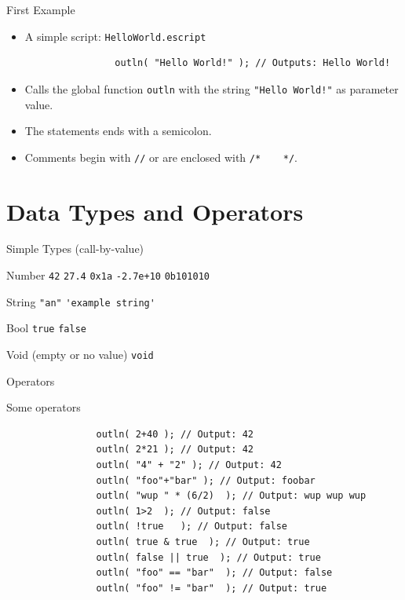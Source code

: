 \documentclass[ucs,9pt]{beamer}
\begin{document}
\begin{frame}[fragile]{First Example}
\begin{itemize}
	\addtolength{\itemsep}{\baselineskip}
	\item A simple script: \lstinline{HelloWorld.escript}
	\small
			\begin{lstlisting}
				outln( "Hello World!" ); // Outputs: Hello World!
			\end{lstlisting}
	\normalsize
	\pause
		\item Calls the global function \lstinline!outln! with the string  \lstinline{"Hello World!"}  as parameter value.
		\item The statements ends with a semicolon.
		\item Comments begin with  \lstinline{//}  or are enclosed with \lstinline{/*    */}.
\end{itemize}
\end{frame}


\section{Data Types and Operators}
\begin{frame}[fragile]{Simple Types (call-by-value)}
	\begin{block}{Number}
		\hfill \lstinline!42! \hfill \lstinline!27.4! \hfill \lstinline!0x1a! \hfill \lstinline!-2.7e+10! \hfill \lstinline!0b101010! \hfill{}
	\end{block}
	\begin{block}{String}
		\hfill \lstinline!"an"! \hfill \lstinline!'example string'!  \hfill{}
	\end{block}
	\begin{block}{Bool}
		\hfill \lstinline!true! \hfill \lstinline!false! \hfill{}
	\end{block}
	\begin{block}{Void (empty or no value)}
		\hfill \lstinline!void! \hfill{}
	\end{block}
\end{frame}

\begin{frame}[fragile]{Operators}
	\begin{block}{Some operators}
				\begin{lstlisting}
				outln( 2+40 ); // Output: 42
				outln( 2*21 ); // Output: 42
				outln( "4" + "2" ); // Output: 42
				outln( "foo"+"bar" ); // Output: foobar
				outln( "wup " * (6/2)  ); // Output: wup wup wup
				outln( 1>2  ); // Output: false
				outln( !true   ); // Output: false
				outln( true & true  ); // Output: true
				outln( false || true  ); // Output: true
				outln( "foo" == "bar"  ); // Output: false
				outln( "foo" != "bar"  ); // Output: true
			\end{lstlisting}
	\end{block}
\end{frame}
	
\end{document}
